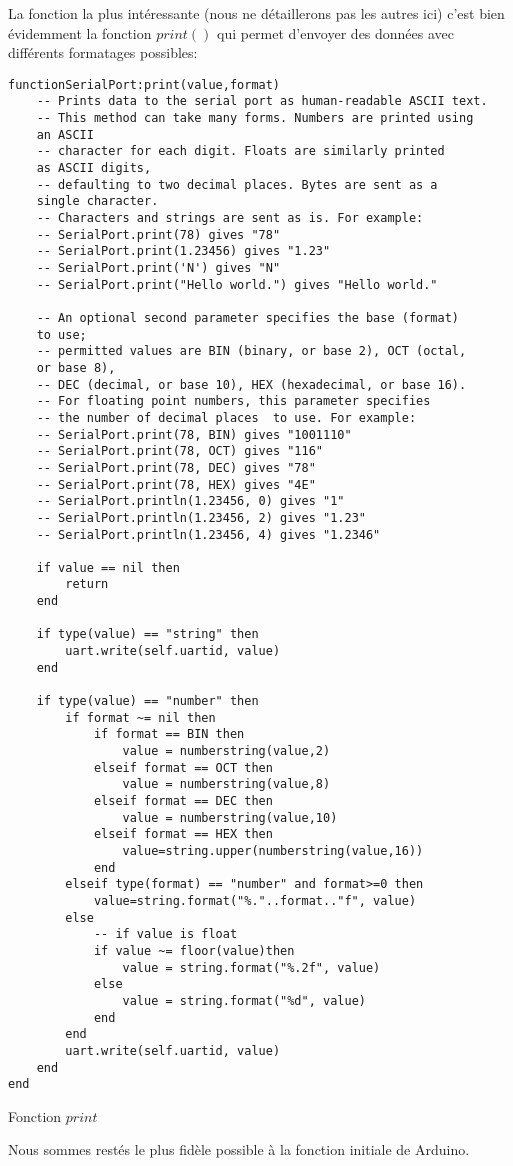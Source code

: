 La fonction la plus intéressante (nous ne détaillerons pas les autres ici) c’est bien évidemment la fonction $print()$ 
qui permet d’envoyer des données avec différents formatages possibles:
\newpage
\begin{table}[h!]
\begin{lstlisting}
functionSerialPort:print(value,format)
    -- Prints data to the serial port as human-readable ASCII text.
    -- This method can take many forms. Numbers are printed using 
	an ASCII
    -- character for each digit. Floats are similarly printed 
	as ASCII digits,
    -- defaulting to two decimal places. Bytes are sent as a 
	single character.
    -- Characters and strings are sent as is. For example:
    -- SerialPort.print(78) gives "78"
    -- SerialPort.print(1.23456) gives "1.23"
    -- SerialPort.print('N') gives "N"
    -- SerialPort.print("Hello world.") gives "Hello world."

    -- An optional second parameter specifies the base (format) 
	to use;
    -- permitted values are BIN (binary, or base 2), OCT (octal, 
	or base 8),
    -- DEC (decimal, or base 10), HEX (hexadecimal, or base 16). 
    -- For floating point numbers, this parameter specifies
    -- the number of decimal places  to use. For example:
    -- SerialPort.print(78, BIN) gives "1001110"
    -- SerialPort.print(78, OCT) gives "116"
    -- SerialPort.print(78, DEC) gives "78"
    -- SerialPort.print(78, HEX) gives "4E"
    -- SerialPort.println(1.23456, 0) gives "1"
    -- SerialPort.println(1.23456, 2) gives "1.23"
    -- SerialPort.println(1.23456, 4) gives "1.2346"

    if value == nil then
        return
    end

    if type(value) == "string" then
        uart.write(self.uartid, value)
    end

    if type(value) == "number" then
        if format ~= nil then
            if format == BIN then
                value = numberstring(value,2)
            elseif format == OCT then
                value = numberstring(value,8)
            elseif format == DEC then
                value = numberstring(value,10)
            elseif format == HEX then
                value=string.upper(numberstring(value,16))
            end
        elseif type(format) == "number" and format>=0 then
            value=string.format("%."..format.."f", value)
        else
            -- if value is float
            if value ~= floor(value)then
                value = string.format("%.2f", value)
            else
                value = string.format("%d", value)
            end
        end
        uart.write(self.uartid, value)
    end
end
\end{lstlisting}
\caption{Fonction $print$}
\end{table}
\newpage
Nous sommes restés le plus fidèle possible à la fonction initiale de Arduino.



